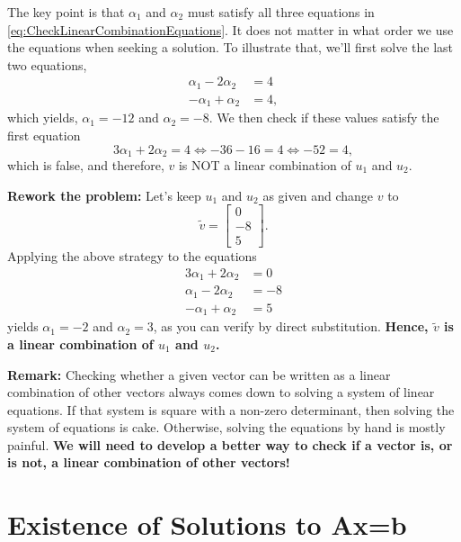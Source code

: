 \vspace*{0.5cm}

\begin{tcolorbox}
The key point is that $\alpha_1$ and $\alpha_2$ must satisfy all three equations in \eqref{eq:CheckLinearCombinationEquations}. It does not matter in what order we use the equations when seeking a solution. To illustrate that, we'll first solve the last two equations, 
\begin{align*}
     \alpha_1 - 2 \alpha_2 &= 4 \\
 -\alpha_1 + \alpha_2 &= 4,
\end{align*}
which yields, $\alpha_1=-12$ and $\alpha_2=-8$. We then check if these values satisfy the first equation
$$ 3\alpha_1 +2 \alpha_2 = 4 \iff -36  - 16 = 4 \iff -52= 4,$$
which is false, and therefore, $v$ is NOT a linear combination of $u_1$ and $u_2$.
\end{tcolorbox}

\vspace*{.5cm} 

\textbf{Rework the problem:} Let's keep $u_1$ and $u_2$ as given and change $v$ to
$$\tilde{v}=  \left[ \begin{array}{r} 0 \\ -8 \\ 5   \end{array} \right].$$
Applying the above strategy to the equations
\begin{align*}
   3 \alpha_1 + 2 \alpha_2 &=0\\
   \alpha_1 - 2 \alpha_2 &= -8\\
   -\alpha_1 + \alpha_2 &= 5
\end{align*}
yields $\alpha_1=-2$ and $\alpha_2=3$, as you can verify by direct substitution. \textbf{Hence, $\tilde{v}$ is a linear combination of $u_1$ and $u_2$.} \Qed

\vspace*{0.5cm}

\textbf{Remark:} Checking whether a given vector can be written as a linear combination of other vectors always comes down to solving a system of linear equations. If that system is square with a non-zero determinant, then solving the system of equations is cake. Otherwise, solving the equations by hand is mostly painful. \textbf{We will need to develop a better way to check if a vector is, or is not, a linear combination of other vectors!}

\section{Existence of Solutions to Ax=b}
\label{sec:UniquenessSolutions}

